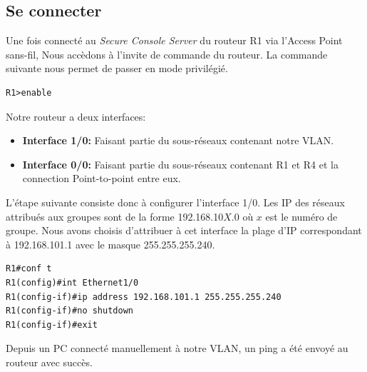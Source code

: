 \documentclass[a4paper,11pt]{article}
\begin{document}
\subsection{Se connecter}
Une fois connecté au \textit{Secure Console Server} du routeur R1 via l'Access Point sans-fil, Nous accèdons à l'invite de commande du routeur.
La commande suivante nous permet de passer en mode privilégié.
\begin{verbatim}
R1>enable
\end{verbatim}
Notre routeur a deux interfaces:
\begin{itemize}
 \item \textbf{Interface 1/0:} Faisant partie du sous-réseaux contenant notre VLAN.
 \item \textbf{Interface 0/0:} Faisant partie du sous-réseaux contenant R1 et R4 et la connection Point-to-point entre eux.
\end{itemize}
L'étape suivante consiste donc à configurer l'interface 1/0.
Les IP des réseaux attribués aux groupes sont de la forme 192.168.10$X$.0 où $x$ est le numéro de groupe.
Nous avons choisis d'attribuer à cet interface la plage d'IP correspondant à 192.168.101.1 avec le masque 255.255.255.240.
\begin{verbatim}
R1#conf t
R1(config)#int Ethernet1/0
R1(config-if)#ip address 192.168.101.1 255.255.255.240
R1(config-if)#no shutdown
R1(config-if)#exit
\end{verbatim}
Depuis un PC connecté manuellement à notre VLAN, un ping a été envoyé au routeur avec succès.
\end{document}
